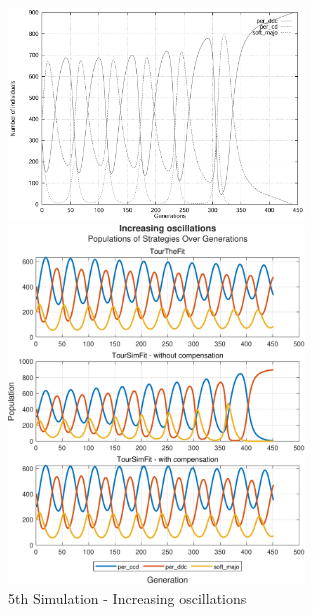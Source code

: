 \documentclass[12pt]{article}
\begin{document}
	\begin{figure}[h]
	      \centering
		  \includegraphics[width=0.7\textwidth]{RefPaperFigures/fig5.jpeg}\par\vspace{0.5em}
	      \includegraphics[width=0.7\textwidth]{Increasing oscillations.pdf}
	      \caption{5th Simulation - Increasing oscillations}
	      \label{fig:Increasing oscillations}
	\end{figure}
\end{document}

